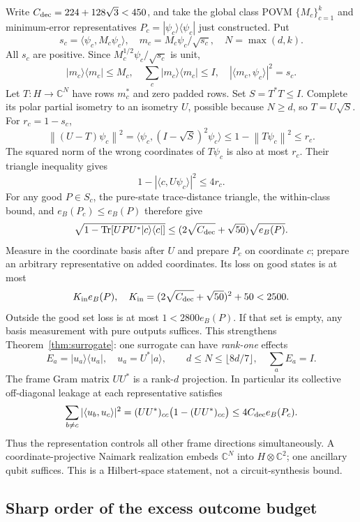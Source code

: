\documentclass[11pt]{article}
\newcommand{\Tr}{\operatorname{Tr}}
\newcommand{\norm}[1]{\left\lVert#1\right\rVert}
\begin{document}
Write $C_{\rm dec}=224+128\sqrt3<450$, and take the global class POVM $\{M_c\}_{c=1}^k$ and minimum-error representatives $P_c=|\psi_c\rangle\langle\psi_c|$ just constructed. Put
\[
s_c=\langle\psi_c,M_c\psi_c\rangle,\quad
m_c=M_c\psi_c/\sqrt{s_c},\quad N=\max(d,k).
\]
All $s_c$ are positive. Since $M_c^{1/2}\psi_c/\sqrt{s_c}$ is unit,
\[
|m_c\rangle\langle m_c|\le M_c,\quad
\sum_c|m_c\rangle\langle m_c|\le I,\quad
|\langle m_c,\psi_c\rangle|^2=s_c.
\]
Let $T:H\to\mathbb C^N$ have rows $m_c^*$ and zero padded rows. Set $S=T^*T\le I$. Complete its polar partial isometry to an isometry $U$, possible because $N\ge d$, so $T=U\sqrt S$. For $r_c=1-s_c$,
\[
\norm{(U-T)\psi_c}^2
=\langle\psi_c,(I-\sqrt S)^2\psi_c\rangle
\le1-\norm{T\psi_c}^2\le r_c.
\]
The squared norm of the wrong coordinates of $T\psi_c$ is also at most $r_c$. Their triangle inequality gives
\[
1-|\langle c,U\psi_c\rangle|^2\le4r_c.
\]
For any good $P\in S_c$, the pure-state trace-distance triangle, the within-class bound, and $e_B(P_c)\le e_B(P)$ therefore give
\[
\sqrt{1-\Tr[UPU^*|c\rangle\langle c|]}
\le(2\sqrt{C_{\rm dec}}+\sqrt{50})\sqrt{e_B(P)}.
\]
Measure in the coordinate basis after $U$ and prepare $P_c$ on coordinate $c$; prepare an arbitrary representative on added coordinates. Its loss on good states is at most
\[
K_{\rm in}e_B(P),\quad
K_{\rm in}=(2\sqrt{C_{\rm dec}}+\sqrt{50})^2+50<2500.
\]
Outside the good set loss is at most $1<2800e_B(P)$. If that set is empty, any basis measurement with pure outputs suffices. This strengthens Theorem~\ref{thm:surrogate}: one surrogate can have \emph{rank-one} effects
\[
E_a=|u_a\rangle\langle u_a|,\quad u_a=U^*|a\rangle,
\qquad d\le N\le\lfloor8d/7\rfloor,\quad \sum_aE_a=I.
\]
The frame Gram matrix $UU^*$ is a rank-$d$ projection. In particular its collective off-diagonal leakage at each representative satisfies
\[
\sum_{b\ne c}|\langle u_b,u_c\rangle|^2
=(UU^*)_{cc}\bigl(1-(UU^*)_{cc}\bigr)
\le4C_{\rm dec}e_B(P_c).
\]
Thus the representation controls all other frame directions simultaneously. A coordinate-projective Naimark realization embeds $\mathbb C^N$ into $H\otimes\mathbb C^2$; one ancillary qubit suffices. This is a Hilbert-space statement, not a circuit-synthesis bound.

\subsection{Sharp order of the excess outcome budget}
\end{document}
